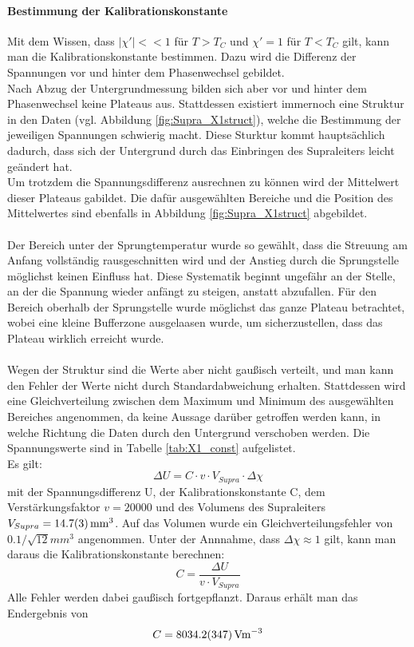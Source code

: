 \documentclass[12pt,a4paper]{article}
\begin{document}
\paragraph{Bestimmung der Kalibrationskonstante}
Mit dem Wissen, dass $|\chi'| << 1$ für $T>T_C$ und $\chi' = 1$ für $T<T_C$ gilt, kann man die Kalibrationskonstante bestimmen. Dazu wird die Differenz der Spannungen vor und hinter dem Phasenwechsel gebildet.\\
Nach Abzug der Untergrundmessung bilden sich aber vor und hinter dem Phasenwechsel keine Plateaus aus. Stattdessen existiert immernoch eine Struktur in den Daten (vgl. Abbildung \ref{fig:Supra_X1struct}), welche die Bestimmung der jeweiligen Spannungen schwierig macht. Diese Sturktur kommt hauptsächlich dadurch, dass sich der Untergrund durch das Einbringen des Supraleiters leicht geändert hat.\\
Um trotzdem die Spannungsdifferenz ausrechnen zu können wird der Mittelwert dieser Plateaus gabildet. Die dafür ausgewählten Bereiche und die Position des Mittelwertes sind ebenfalls in Abbildung \ref{fig:Supra_X1struct} abgebildet.\\
\\
Der Bereich unter der Sprungtemperatur wurde so gewählt, dass die Streuung am Anfang vollständig rausgeschnitten wird und der Anstieg durch die Sprungstelle möglichst keinen Einfluss hat. Diese Systematik beginnt ungefähr an der Stelle, an der die Spannung wieder anfängt zu steigen, anstatt abzufallen. Für den Bereich oberhalb der Sprungstelle wurde möglichst das ganze Plateau betrachtet, wobei eine kleine Bufferzone ausgelaasen wurde, um sicherzustellen, dass das Plateau wirklich erreicht wurde.\\
\\
Wegen der Struktur sind die Werte aber nicht gaußisch verteilt, und man kann den Fehler der Werte nicht durch Standardabweichung erhalten. Stattdessen wird eine Gleichverteilung zwischen dem Maximum und Minimum des ausgewählten Bereiches angenommen, da keine Aussage darüber getroffen werden kann, in welche Richtung die Daten durch den Untergrund verschoben werden. Die Spannungswerte sind in Tabelle \ref{tab:X1_const} aufgelistet.\\
Es gilt:
\begin{equation}
\Delta U = C \cdot v \cdot V_{Supra} \cdot \Delta\chi
\end{equation}
mit der Spannungsdifferenz U, der Kalibrationskonstante C, dem Verstärkungsfaktor $v=20000$ und des Volumens des Supraleiters $V_{Supra} =\SI{ 14.7\pm 0.3}{mm^3}$. Auf das Volumen wurde ein Gleichverteilungsfehler von $0.1/\sqrt{12}mm^3$ angenommen. Unter der Annnahme, dass $\Delta\chi \approx 1$ gilt, kann man daraus die Kalibrationskonstante berechnen:
\begin{equation}
C = \dfrac{\Delta U}{v\cdot V_{Supra}}
\end{equation}
Alle Fehler werden dabei gaußisch fortgepflanzt. Daraus erhält man das Endergebnis von
\begin{equation*}
C = \SI{8034.2\pm 34.7}{Vm^{-3}}
\end{equation*}
\end{document}
